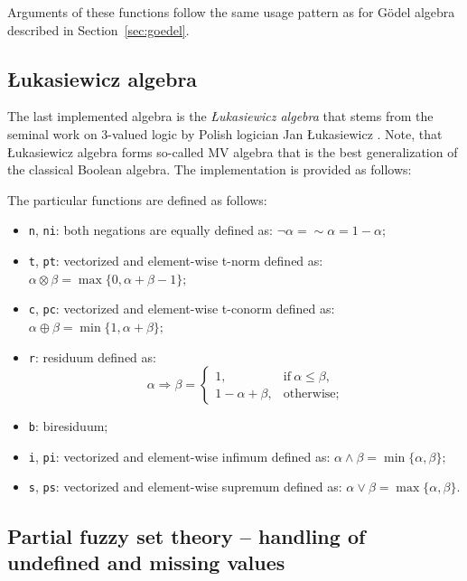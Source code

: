 \documentclass[review]{elsarticle}
\newcommand{\code}[1]{\texttt{#1}}
\begin{document}
Arguments of these functions follow the same usage pattern as for G\"odel algebra described in Section~\ref{sec:goedel}.



\subsection[Lukasiewicz algebra]{\L ukasiewicz algebra}

The last implemented algebra is the \emph{\L{}ukasiewicz algebra} that stems from the seminal work on 3-valued logic by Polish logician Jan \L{}ukasiewicz \cite{lukasiewicz19673}. Note, that \L ukasiewicz algebra forms so-called MV algebra \citep{Chang:MV_1958} that is the best generalization of the classical Boolean algebra. The implementation is provided as follows:


%
The particular functions are defined as follows:

\begin{itemize}
    \item \code{n}, \code{ni}: both negations are equally defined as:
    $\lnot\alpha = {\sim}\alpha = 1 - \alpha;$
    \item \code{t}, \code{pt}: vectorized and element-wise t-norm defined as:
    $\alpha \otimes \beta = \max\{0, \alpha + \beta - 1\};$
    \item \code{c}, \code{pc}: vectorized and element-wise t-conorm defined as: $\alpha \oplus \beta = \min\{1, \alpha + \beta\};$
    \item \code{r}: residuum defined as:
    $$
    \alpha\Rightarrow\beta = \begin{cases}
    1, & \text{if}\ \alpha\le\beta, \\
    1 - \alpha + \beta, & \text{otherwise;}
    \end{cases}
    $$
    \item \code{b}: biresiduum;
    \item \code{i}, \code{pi}: vectorized and element-wise infimum defined as:
    $\alpha \land \beta = \min\{\alpha, \beta\};$
    \item \code{s}, \code{ps}: vectorized and element-wise supremum defined as:
    $\alpha \lor \beta = \max\{\alpha, \beta\}.$
\end{itemize}



\subsection{Partial fuzzy set theory -- handling of undefined and missing values}
\label{sec:undefvals}
\end{document}
